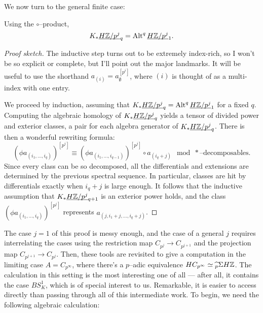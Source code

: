We now turn to the general finite case:
\begin{theorem}
Using the $\circ$--product, \[K_* \underline{\smash{H\mathbb Z/p^j}}_{q} = \operatorname{Alt}^q \underline{\smash{H\mathbb Z/p^j}}_{1}.\]
\end{theorem}
\begin{proof}[Proof sketch]
The inductive step turns out to be extremely index-rich, so I won't be so explicit or complete, but I'll point out the major landmarks.  It will be useful to use the shorthand $a_{(i)} = a_\emptyset^{[p^i]}$, where $(i)$ is thought of as a multi-index with one entry.

We proceed by induction, assuming that $K_* \underline{\smash{H\mathbb Z/p^j}}_{q} = \operatorname{Alt}^q \underline{\smash{H\mathbb Z/p^j}}_{1}$ for a fixed $q$.  Computing the algebraic homology of $K_* \underline{\smash{H\mathbb Z/p^j}}_{q}$ yields a tensor of divided power and exterior classes, a pair for each algebra generator of $K_* \underline{\smash{H\mathbb Z/p^j}}_{q}$.  There is then a wonderful rewriting formula: \[(\phi a_{(i_1, \ldots, i_q)})^{[p^j]} \equiv  (\phi a_{(i_1, \ldots, i_{q-1})})^{[p^j]} \circ a_{(i_q + j)} \mod *\text{--decomposables}.\]  Since every class can be so decomposed, all the differentials and extensions are determined by the previous spectral sequence.  In particular, classes are hit by differentials exactly when $i_q + j$ is large enough.  It follows that the inductive assumption that $K_* \underline{\smash{H\mathbb Z/p^j}}_{q+1}$ is an exterior power holds, and the class $(\phi a_{(i_1, \ldots, i_q)})^{[p^j]}$ represents $a_{(j, i_1 + j, \ldots, i_q + j)}$.
\end{proof}


The case $j = 1$ of this proof is messy enough, and the case of a general $j$ requires interrelating the cases using the restriction map $C_{p^j} \to C_{p^{j+1}}$ and the projection map $C_{p^{j+1}} \to C_{p^j}$.  Then, these tools are revisited to give a computation in the limiting case $A = C_{p^\infty}$, where there's a $p$--adic equivalence $HC_{p^\infty} \simeq\widehat{{}_p} \Sigma H\mathbb Z$.  The calculation in this setting is the most interesting one of all --- after all, it contains the case $BS^1_K$, which is of special interest to us.  Remarkable, it is easier to access directly than passing through all of this intermediate work.  To begin, we need the following algebraic calculation:

